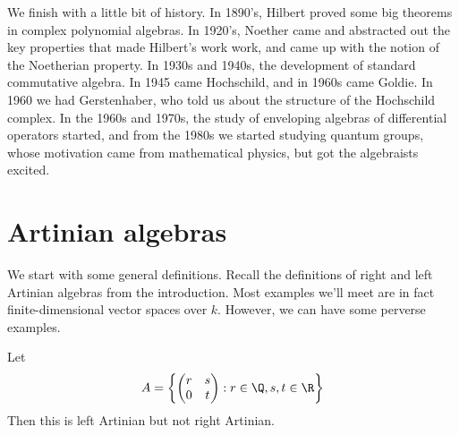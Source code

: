 \documentclass[a4paper]{article}
\begin{document}
We finish with a little bit of history. In 1890's, Hilbert proved some big theorems in complex polynomial algebras. In 1920's, Noether came and abstracted out the key properties that made Hilbert's work work, and came up with the notion of the Noetherian property. In 1930s and 1940s, the development of standard commutative algebra. In 1945 came Hochschild, and in 1960s came Goldie. In 1960 we had Gerstenhaber, who told us about the structure of the Hochschild complex. In the 1960s and 1970s, the study of enveloping algebras of differential operators started, and from the 1980s we started studying quantum groups, whose motivation came from mathematical physics, but got the algebraists excited.

\section{Artinian algebras}
We start with some general definitions. Recall the definitions of right and left Artinian algebras from the introduction. Most examples we'll meet are in fact finite-dimensional vector spaces over $k$. However, we can have some perverse examples.

\begin{eg}
  Let
  \[
    A = \left\{
      \begin{pmatrix}
        r & s\\
        0 & t
      \end{pmatrix}: r \in \Q, s, t \in \R
    \right\}
  \]
  Then this is left Artinian but not right Artinian.
\end{eg}
\end{document}

